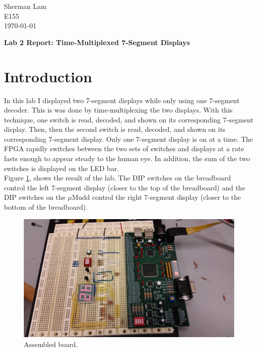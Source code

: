 \documentclass[11pt]{article}
\begin{document}
\begin{flushleft}
Sherman Lam
\\E155
\\ \today
\end{flushleft}


\begin{center}
\begin{Large}
\textbf{Lab 2 Report: Time-Multiplexed 7-Segment Displays}
\end{Large}
\end{center}




\section{Introduction}
\label{sec:intro}

In this lab I displayed two 7-segment displays while only using one 7-segment decoder. This is was done by time-multiplexing the two displays. With this technique, one switch is read, decoded, and shown on its corresponding 7-segment display. Then, then the second switch is read, decoded, and shown on its corresponding 7-segment display. Only one 7-segment display is on at a time. The FPGA rapidly switches between the two sets of switches and displays at a rate fasts enough to appear steady to the human eye. In addition, the sum of the two switches is displayed on the LED bar. \\

Figure \ref{fig:board}, shows the result of the lab. The DIP switches on the breadboard control the left 7-segment display (closer to the top of the breadboard) and the DIP switches on the $\mu$Mudd control the right 7-segment display (closer to the bottom of the breadboard). 

\begin{figure}[h!]
\centering
\includegraphics[scale=0.11]{board.jpg}
\caption{Assembled board.}
\label{fig:board}
\end{figure} 
\end{document}
